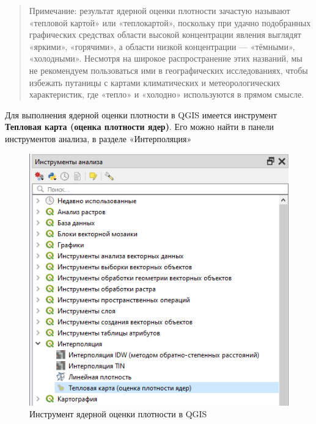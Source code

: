 \documentclass[
  12pt,
]{book}
\begin{document}
\begin{quote}
Примечание: результат ядерной оценки плотности зачастую называют «тепловой картой» или «теплокартой», поскольку при удачно подобранных графических средствах области высокой концентрации явления выглядят «яркими», «горячими», а области низкой концентрации --- «тёмными», «холодными». Несмотря на широкое распространение этих названий, мы не рекомендуем пользоваться ими в географических исследованиях, чтобы избежать путаницы с картами климатических и метеорологических характеристик, где «тепло» и «холодно» используются в прямом смысле.
\end{quote}

Для выполнения ядерной оценки плотности в QGIS имеется инструмент \textbf{Тепловая карта (оценка плотности ядер)}. Его можно найти в панели инструментов анализа, в разделе «Интерполяция»

\begin{figure}
\centering
\includegraphics{images/Ex08_Geocoding/kde00.png}
\caption{Инструмент ядерной оценки плотности в QGIS}
\end{figure}
\end{document}
